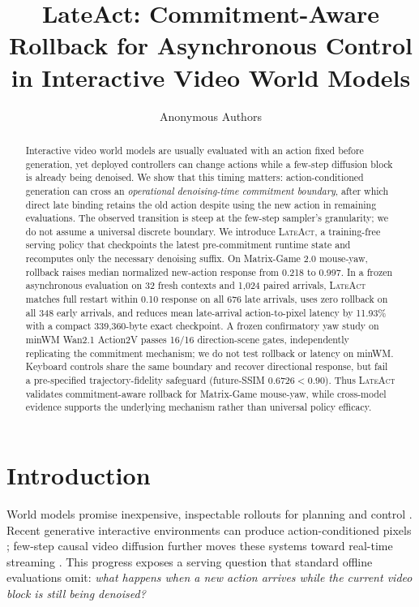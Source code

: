 \documentclass{article}
\title{LateAct: Commitment-Aware Rollback for Asynchronous Control\\
in Interactive Video World Models}
\author{Anonymous Authors}
\newcommand{\method}{\textsc{LateAct}}
\begin{document}
\maketitle

\begin{abstract}
Interactive video world models are usually evaluated with an action fixed
before generation, yet deployed controllers can change actions while a
few-step diffusion block is already being denoised. We show that this timing
matters: action-conditioned generation can cross an \emph{operational
denoising-time commitment boundary}, after which direct late binding retains
the old action despite using the new action in remaining evaluations. The
observed transition is steep at the few-step sampler's granularity; we do not
assume a universal discrete boundary.
We introduce \method{}, a training-free serving policy that checkpoints the
latest pre-commitment runtime state and recomputes only the necessary denoising
suffix. On Matrix-Game 2.0 mouse-yaw, rollback raises median normalized
new-action response from 0.218 to 0.997. In a frozen asynchronous evaluation on
32 fresh contexts and 1,024 paired arrivals, \method{} matches full restart
within 0.10 response on all 676 late arrivals, uses zero rollback on all 348
early arrivals, and reduces mean late-arrival action-to-pixel latency by
11.93\% with a compact 339,360-byte exact checkpoint. A frozen confirmatory yaw
study on minWM Wan2.1 Action2V passes 16/16 direction-scene gates,
independently replicating the commitment mechanism; we do not test rollback or latency on
minWM. Keyboard controls share the same boundary and recover directional
response, but fail a pre-specified trajectory-fidelity safeguard
(future-SSIM $0.6726<0.90$). Thus \method{} validates commitment-aware rollback
for Matrix-Game mouse-yaw, while cross-model evidence supports the underlying
mechanism rather than universal policy efficacy.
\end{abstract}

\section{Introduction}
\label{sec:intro}

World models promise inexpensive, inspectable rollouts for planning and
control \citep{ha2018worldmodels,hafner2023dreamerv3}. Recent generative
interactive environments can produce action-conditioned pixels
\citep{bruce2024genie,valevski2025gamengen,alonso2024diamond}; few-step causal
video diffusion further moves these systems toward real-time streaming
\citep{he2025matrixgame2,zhao2026minwm}. This progress exposes a serving
question that standard offline evaluations omit: \emph{what happens when a new
action arrives while the current video block is still being denoised?}
\end{document}
